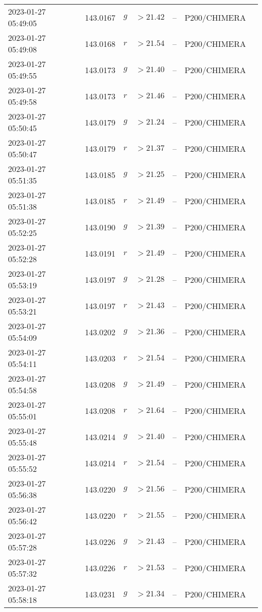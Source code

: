 \documentclass{nature_plusfigure}
\begin{document}
\begin{supplement}
\begin{center}
\begin{longtable}{lllllll}
2023-01-27 05:49:05 & 143.0167 & $g$ & $>21.42$ & -- & P200/CHIMERA &  \\ 
2023-01-27 05:49:08 & 143.0168 & $r$ & $>21.54$ & -- & P200/CHIMERA &  \\ 
2023-01-27 05:49:55 & 143.0173 & $g$ & $>21.40$ & -- & P200/CHIMERA &  \\ 
2023-01-27 05:49:58 & 143.0173 & $r$ & $>21.46$ & -- & P200/CHIMERA &  \\ 
2023-01-27 05:50:45 & 143.0179 & $g$ & $>21.24$ & -- & P200/CHIMERA &  \\ 
2023-01-27 05:50:47 & 143.0179 & $r$ & $>21.37$ & -- & P200/CHIMERA &  \\ 
2023-01-27 05:51:35 & 143.0185 & $g$ & $>21.25$ & -- & P200/CHIMERA &  \\ 
2023-01-27 05:51:38 & 143.0185 & $r$ & $>21.49$ & -- & P200/CHIMERA &  \\ 
2023-01-27 05:52:25 & 143.0190 & $g$ & $>21.39$ & -- & P200/CHIMERA &  \\ 
2023-01-27 05:52:28 & 143.0191 & $r$ & $>21.49$ & -- & P200/CHIMERA &  \\ 
2023-01-27 05:53:19 & 143.0197 & $g$ & $>21.28$ & -- & P200/CHIMERA &  \\ 
2023-01-27 05:53:21 & 143.0197 & $r$ & $>21.43$ & -- & P200/CHIMERA &  \\ 
2023-01-27 05:54:09 & 143.0202 & $g$ & $>21.36$ & -- & P200/CHIMERA &  \\ 
2023-01-27 05:54:11 & 143.0203 & $r$ & $>21.54$ & -- & P200/CHIMERA &  \\ 
2023-01-27 05:54:58 & 143.0208 & $g$ & $>21.49$ & -- & P200/CHIMERA &  \\ 
2023-01-27 05:55:01 & 143.0208 & $r$ & $>21.64$ & -- & P200/CHIMERA &  \\ 
2023-01-27 05:55:48 & 143.0214 & $g$ & $>21.40$ & -- & P200/CHIMERA &  \\ 
2023-01-27 05:55:52 & 143.0214 & $r$ & $>21.54$ & -- & P200/CHIMERA &  \\ 
2023-01-27 05:56:38 & 143.0220 & $g$ & $>21.56$ & -- & P200/CHIMERA &  \\ 
2023-01-27 05:56:42 & 143.0220 & $r$ & $>21.55$ & -- & P200/CHIMERA &  \\ 
2023-01-27 05:57:28 & 143.0226 & $g$ & $>21.43$ & -- & P200/CHIMERA &  \\ 
2023-01-27 05:57:32 & 143.0226 & $r$ & $>21.53$ & -- & P200/CHIMERA &  \\ 
2023-01-27 05:58:18 & 143.0231 & $g$ & $>21.34$ & -- & P200/CHIMERA &  \\ 

\end{longtable}
\end{center}
\end{supplement}
\end{document}
